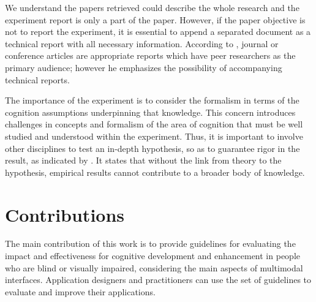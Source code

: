 We understand the papers retrieved could describe the whole research and the experiment report is only a part of the paper. However, if the paper objective is not to report the experiment, it is essential to append a separated document as a technical report with all necessary information. According to , journal or conference articles are appropriate reports which have peer researchers as the primary audience; however he emphasizes the possibility of accompanying technical reports.


The importance of the experiment is to consider the formalism in terms of the cognition assumptions underpinning that knowledge. This concern introduces challenges in concepts and formalism of the area of cognition that must be well studied and understood within the experiment. Thus, it is important to involve other disciplines to test an in-depth hypothesis, so as to guarantee rigor in the result, as indicated by . It states that without the link from theory to the hypothesis, empirical results cannot contribute to a broader body of knowledge.

\section{Contributions}
\label{sec:conclusion-contributions}

The main contribution of this work is to provide guidelines for evaluating the impact and effectiveness for cognitive development and enhancement in people who are blind or visually impaired, considering the main aspects of multimodal interfaces. Application designers and practitioners can use the set of guidelines to evaluate and improve their applications.



